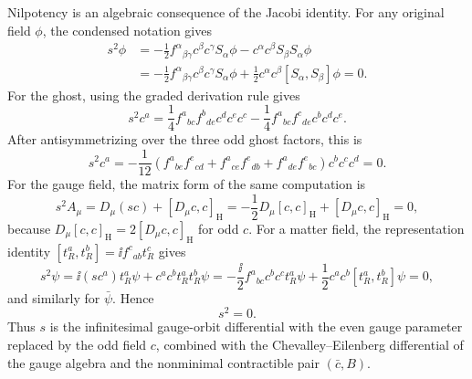 Nilpotency is an algebraic consequence of the Jacobi identity.  For any
original field \(\phi\), the condensed notation gives
\[
\begin{aligned}
  s^2\phi
  &=
  -\frac12 f^\alpha{}_{\beta\gamma}c^\beta c^\gamma S_\alpha\phi
  -c^\alpha c^\beta S_\beta S_\alpha\phi
\\
  &=
  -\frac12 f^\alpha{}_{\beta\gamma}c^\beta c^\gamma S_\alpha\phi
  +\frac12 c^\alpha c^\beta[S_\alpha,S_\beta]\phi
  =
  0 .
\end{aligned}
\]
For the ghost, using the graded derivation rule gives
\[
  s^2c^a
  =
  \frac14 f^a{}_{bc} f^b{}_{de} c^d c^e c^c
  -\frac14 f^a{}_{bc} f^c{}_{de} c^b c^d c^e .
\]
After antisymmetrizing over the three odd ghost factors, this is
\[
  s^2c^a
  =
  -\frac1{12}
  \left(
    f^a{}_{be}f^e{}_{cd}
    +f^a{}_{ce}f^e{}_{db}
    +f^a{}_{de}f^e{}_{bc}
  \right)c^b c^c c^d
  =
  0 .
\]
For the gauge field, the matrix form of the same computation is
\[
  s^2A_\mu
  =
  D_\mu(sc)+[D_\mu c,c]_{\mathrm H}
  =
  -\frac12D_\mu[c,c]_{\mathrm H}+[D_\mu c,c]_{\mathrm H}
  =
  0,
\]
because \(D_\mu[c,c]_{\mathrm H}=2[D_\mu c,c]_{\mathrm H}\) for odd \(c\).
For a matter field, the representation identity
\([t_R^a,t_R^b]=\ii f^c{}_{ab}t_R^c\) gives
\[
  s^2\psi
  =
  \ii(sc^a)t_R^a\psi+c^a c^b t_R^a t_R^b\psi
  =
  -\frac{\ii}{2} f^a{}_{bc}c^b c^c t_R^a\psi
  +\frac12 c^a c^b[t_R^a,t_R^b]\psi
  =
  0,
\]
and similarly for \(\bar\psi\).  Hence
\begin{equation}
  s^2=0.
  \label{eq:brst-nilpotency}
\end{equation}
Thus \(s\) is the infinitesimal gauge-orbit differential with the even gauge
parameter replaced by the odd field \(c\), combined with the
Chevalley--Eilenberg differential of the gauge algebra and the nonminimal
contractible pair \((\bar c,B)\).

